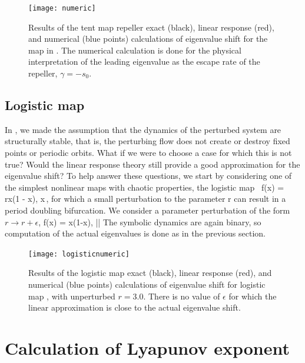 \documentclass[aps,pre,
                showpacs,
                twocolumn,
                groupedaddress,
                superscriptaddress,
                floatfix]{revtex4-1}
\begin{document}
\begin{figure}[htbp]
\texttt{[image: numeric]}
    \caption{\label{fig:numeric}
Results of the tent map repeller exact (black), linear response (red),
and numerical (blue points) calculations of eigenvalue shift for the map
in .
The numerical calculation is done for
the physical interpretation of the leading eigenvalue as the escape rate
of the repeller, $\gamma = -s_{0}$.
    }
\end{figure}

\subsection{Logistic map}
\label{sect:logstMap}

In , we made the assumption that the dynamics of the
perturbed system are structurally stable, that is, the perturbing flow
does not create or destroy fixed points or periodic orbits. What if we
were to choose a case for which this is not true? Would the linear
response theory still provide a good approximation for the eigenvalue
shift? To help answer these questions, we start by considering one of the
simplest nonlinear maps with chaotic properties, the logistic map\
\beq
f(x) = rx(1 - x), x\in [0, 1]
\,,
for which a small perturbation to the parameter r can result in a period
doubling bifurcation. We consider a parameter perturbation of the form
$r \to r+\epsilon$,
\beq
\epsilon \delta f(x) = \epsilon x(1-x), |\epsilon|
\eeq
The symbolic dynamics are again binary, so computation of the actual
eigenvalues is done as in the previous section.

\begin{figure}[htbp]
\texttt{[image: logisticnumeric]}
    \caption{\label{fig:logisticnumeric}
Results of the logistic map exact (black), linear response (red), and
numerical (blue points) calculations of eigenvalue shift for logistic map
\refeq{logstMap}, with unperturbed $r=3.0$. There is no value of
$\epsilon$ for which the linear approximation is close to the actual
eigenvalue shift.
        }
\end{figure}

\section{Calculation of Lyapunov exponent}
\label{sect:LyapExp}
\end{document}
